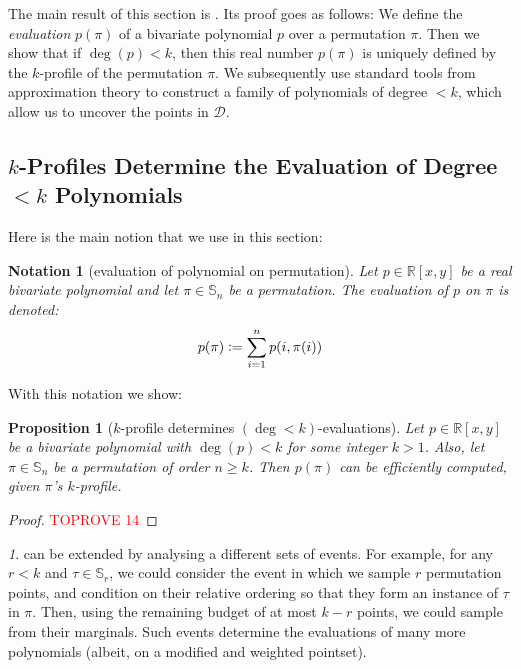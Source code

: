 \documentclass{article}
\newtheorem{proposition}[theorem]{Proposition}
\newtheorem{notation}[theorem]{Notation}
\newcommand{\Sn}{\mathbb{S}_n}
\newcommand{\RR}{\mathbb{R}}
\newcommand{\eqdef}{\vcentcolon=}
\theoremstyle{remark}
\newtheorem{rem}[theorem]{\protect\remarkname}
\providecommand{\remarkname}{Remark}
\theoremstyle{plain}
\begin{document}
The main result of this section is . Its proof goes
as follows: We define the {\em evaluation} $p(\pi)$ of a bivariate polynomial $p$ over a permutation $\pi$. Then we show that if $\deg(p)<k$, then this real number $p(\pi)$ is uniquely defined by the $k$-profile of the permutation $\pi$. We subsequently use standard tools from approximation theory to construct a family of polynomials of degree $<k$, which allow us to uncover the points in $\mathcal{D}$.

\subsection{\texorpdfstring{$k$}{k}-Profiles Determine the Evaluation of Degree \texorpdfstring{$< k$}{<k} Polynomials}
\label{subsect:k_prof_determines_deg_k_polys}

Here is the main notion that we use in this section:

\begin{notation}[evaluation of polynomial on permutation]
    \label{notn:eval_poly_perm}
    Let $p \in \RR[x,y]$ be a real bivariate polynomial and let $\pi \in \Sn$ be a permutation. The evaluation of $p$ on $\pi$ is denoted:
    \[
        p(\pi) \eqdef \sum_{i=1}^n p(i, \pi(i))
    \]    
\end{notation}  

With this notation we show:

\begin{proposition}[$k$-profile determines $(\deg < k)$-evaluations]
    \label{prop:k_prof_to_poly}
    Let $p \in \RR[x,y]$ be a bivariate polynomial with $\deg(p) < k$ for some integer $k > 1$. Also, let $\pi \in \Sn$ be a permutation of order $n\ge k$. Then $p(\pi)$ can be efficiently computed, given $\pi$'s $k$-profile. 
\end{proposition}
\begin{proof}\textcolor{red}{TOPROVE 14}\end{proof}

\begin{rem}
     can be extended by analysing a different sets of events. For example, for any $r < k$ and $\tau \in \mathbb{S}_r$, we could consider the event in which we sample $r$ permutation points, and condition on their relative ordering so that they form an instance of $\tau$ in $\pi$. Then, using the remaining budget of at most $k-r$ points, we could sample from their marginals. Such events determine the evaluations of many more polynomials (albeit, on a modified and weighted pointset).
\end{rem}
\end{document}
